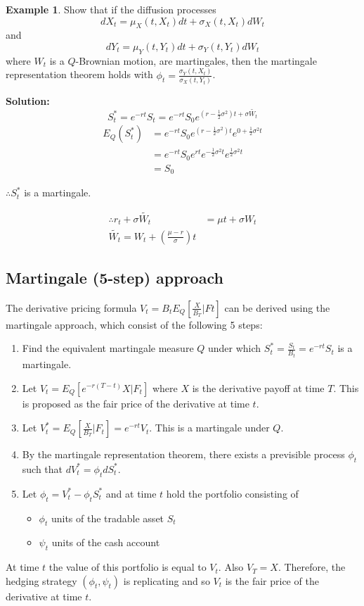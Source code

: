 \documentclass[11pt,a4paper]{book}
\theoremstyle{definition}\newtheorem{definition}{Definition}
\theoremstyle{definition}\newtheorem{fact}{Fact}
\theoremstyle{definition}\newtheorem{remark}{Remark}
\theoremstyle{definition}\newtheorem{ex}{Ex.}
\theoremstyle{definition}\newtheorem{project}{Project}
\theoremstyle{definition}\newtheorem{problem}{Problem}
\theoremstyle{definition}\newtheorem{example}{Example}
\numberwithin{theorem}{section}
\numberwithin{corollary}{chapter}
\numberwithin{assumption}{chapter}
\numberwithin{definition}{chapter}
\numberwithin{prop}{chapter}
\numberwithin{notation}{chapter}
\numberwithin{problem}{chapter}
\numberwithin{example}{chapter}
\numberwithin{fact}{chapter}
\numberwithin{ex}{chapter}
\begin{document}
\begin{example}
Show that if the diffusion processes
$$ dX_t = \mu_X(t,X_t) dt + \sigma_X(t,X_t) dW_t $$
and 
$$ dY_t = \mu_Y(t,Y_t) dt + \sigma_Y(t,Y_t) dW_t $$
where $W_t$ is a $Q$-Brownian motion, are martingales, then the martingale representation theorem holds with $\phi_t = \frac{\sigma_Y(t,X_t)}{\sigma_X(t,Y_t)}$.

\vspace{15pt}
\textbf{Solution:}
$$ S_t^* = e^{-rt}S_t = e^{-rt}S_0e^{(r-\frac{1}{2}\sigma^2)t + \sigma \tilde{W_t}} $$
\begin{align*}
E_Q(S_t^*) &= e^{-rt}S_0 e^{(r-\frac{1}{2}\sigma^2)t} e^{0+\frac{1}{2}\sigma^2 t} \\
&= e^{-rt}S_0 e^{rt} e^{-\frac{1}{2}\sigma^2 t} e^{\frac{1}{2}\sigma^2 t} \\
&= S_0
\end{align*}

$\therefore S_t^*$ is a martingale.

\begin{align*}
\therefore r_t + \sigma \tilde{W_t} &= \mu t + \sigma W_t \\
\tilde{W_t} = W_t + \left( \frac{\mu - r}{\sigma} \right) t
\end{align*}
\end{example}

\subsection{Martingale (5-step) approach}
The derivative pricing formula $V_t = B_t E_Q[\frac{X}{B_T}|Ft]$ can be derived using the martingale approach, which consist of the following 5 steps:
\begin{enumerate}
\item Find the equivalent martingale measure $Q$ under which $S_t^* = \frac{S_t}{B_t} = e^{-rt} S_t$ is a martingale.
\item Let $V_t = E_Q[e^{-r(T-t)}X|F_t]$ where $X$ is the derivative payoff at time $T$. This is proposed as the fair price of the derivative at time $t$.
\item Let $V_t^* = E_Q[\frac{X}{B_T}|F_t] = e^{-rt}V_t$. This is a martingale under $Q$.
\item By the martingale representation theorem, there exists a previsible process $\phi_t$ such that $dV_t^* = \phi_t dS_t^*$.
\item Let $\phi_t = V_t^* - \phi_t S_t^*$ and at time $t$ hold the portfolio consisting of
\begin{itemize}
\item $\phi_t$ units of the tradable asset $S_t$
\item $\psi_t$ units of the cash account
\end{itemize}
\end{enumerate}
At time $t$ the value of this portfolio is equal to $V_t$. Also $V_T = X$. Therefore, the hedging strategy $(\phi_t,\psi_t)$ is replicating and so $V_t$ is the fair price of the derivative at time $t$.
\end{document}
